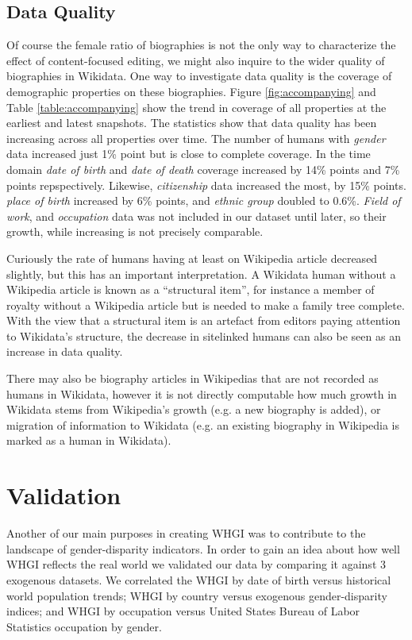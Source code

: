 \documentclass{sig-alternate-05-2015}
\begin{document}
\subsection{Data Quality}

Of course the female ratio of biographies is not the only way to characterize the effect of content-focused editing, we might also inquire to the wider quality of biographies in Wikidata. One way to investigate data quality is the coverage of demographic  properties on these biographies. Figure \ref{fig:accompanying} and Table \ref{table:accompanying} show the trend in coverage of all properties at the earliest and latest snapshots. The statistics show that data quality has been increasing across all properties over time. The number of humans with \textit{gender} data increased just 1\% point but is close to complete coverage. In the time domain \textit{date of birth} and \textit{date of death} coverage increased by 14\% points and 7\% points repspectively. Likewise, \textit{citizenship} data increased the most, by 15\% points. \textit{place of birth} increased by 6\% points, and \textit{ethnic group} doubled to 0.6\%. \textit{Field of work}, and \textit{occupation} data was not included in our dataset until later, so their growth, while increasing is not precisely comparable.


Curiously the rate of humans having at least on Wikipedia article decreased slightly, but this has an important interpretation. A Wikidata human without a Wikipedia article is known as a ``structural item'', for instance a member of royalty without a Wikipedia article but is needed to make a family tree complete. With the view that a structural item is an artefact from editors paying attention to Wikidata's structure, the decrease in sitelinked humans can also be seen as an increase in data quality.

There may also be biography articles in Wikipedias that are not recorded as humans in Wikidata, however it is not directly computable how much growth in Wikidata stems from Wikipedia's growth (e.g. a new biography is added), or migration of information to Wikidata (e.g. an existing biography in Wikipedia is marked as a human in Wikidata).


\section{Validation}

Another of our main purposes in creating WHGI was to contribute to the landscape of gender-disparity indicators. In order to gain an idea about how well WHGI reflects the real world we validated our data by comparing it against 3 exogenous datasets. We correlated the WHGI by date of birth versus historical world population trends; WHGI by country versus exogenous gender-disparity indices; and WHGI by occupation versus United States Bureau of Labor Statistics occupation by gender.
\end{document}
